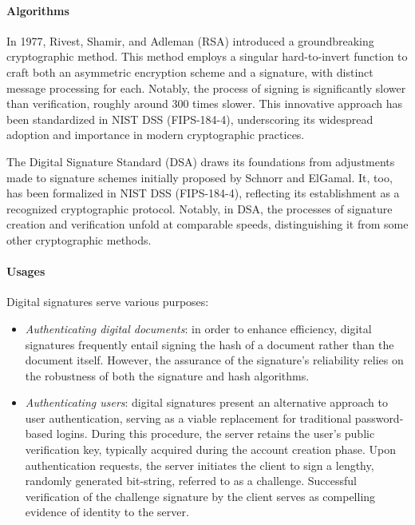 \paragraph*{Algorithms}
In 1977, Rivest, Shamir, and Adleman (RSA) introduced a groundbreaking cryptographic method. 
This method employs a singular hard-to-invert function to craft both an asymmetric encryption scheme and a signature, with distinct message processing for each. 
Notably, the process of signing is significantly slower than verification, roughly around 300 times slower. 
This innovative approach has been standardized in NIST DSS (FIPS-184-4), underscoring its widespread adoption and importance in modern cryptographic practices.

The Digital Signature Standard (DSA) draws its foundations from adjustments made to signature schemes initially proposed by Schnorr and ElGamal. 
It, too, has been formalized in NIST DSS (FIPS-184-4), reflecting its establishment as a recognized cryptographic protocol. 
Notably, in DSA, the processes of signature creation and verification unfold at comparable speeds, distinguishing it from some other cryptographic methods.

\paragraph*{Usages}
Digital signatures serve various purposes:
\begin{itemize}
    \item \textit{Authenticating digital documents}: in order to enhance efficiency, digital signatures frequently entail signing the hash of a document rather than the document itself. 
        However, the assurance of the signature's reliability relies on the robustness of both the signature and hash algorithms.
    \item \textit{Authenticating users}: digital signatures present an alternative approach to user authentication, serving as a viable replacement for traditional password-based logins. 
        During this procedure, the server retains the user's public verification key, typically acquired during the account creation phase. 
        Upon authentication requests, the server initiates the client to sign a lengthy, randomly generated bit-string, referred to as a challenge. 
        Successful verification of the challenge signature by the client serves as compelling evidence of identity to the server.
\end{itemize}